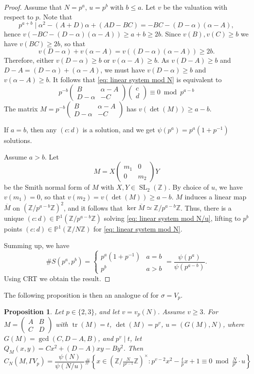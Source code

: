 \documentclass[12pt]{amsart}
\renewcommand{\P}{\mathbb{P}}
\newcommand{\Z}{\mathbb{Z}}
\DeclareMathOperator{\tr}{tr}
\newcommand{\SL}{\operatorname{SL}}
\numberwithin{equation}{subsection}
\theoremstyle{plain}\newtheorem{ithm}{Theorem}
\theoremstyle{plain}\newtheorem{iprop}[ithm]{Proposition}
\newtheorem{proposition}[equation]{Proposition}
\theoremstyle{definition}
\theoremstyle{remark}
\newcommand{\mattwo}[4]{\left( \begin{array}{cc} {#1} & {#2} \\ {#3} & {#4} \end{array} \right)}
\newcommand{\vectwo}[2]{\left( \begin{array}{c} {#1} \\ {#2} \end{array} \right)}
\begin{document}
\begin{proof}
    Assume that $N = p^a$, $u = p^b$ with $b \le a$. Let $v$ be the valuation with respect to $p$. 
    Note that
    $$
    p^{a+b} \mid \alpha^2 - (A+D) \alpha + (AD-BC) = -BC - (D-\alpha)(\alpha - A),
    $$
    hence $v(-BC - (D-\alpha)(\alpha - A)) \ge a + b \ge 2b$. 
    Since $v(B), v(C) \ge b$ we have $v(BC) \ge 2b$, so that 
    $$
    v(D - \alpha) + v(\alpha - A) = v((D - \alpha)(\alpha - A)) \ge 2b.
    $$
    Therefore, either $v(D - \alpha) \ge b$ or $v(\alpha - A) \ge b$.
    As $v(D - A) \ge b$ and $D - A = (D - \alpha) + (\alpha - A)$, we must have $v(D - \alpha) \ge b$ and $v(\alpha - A) \ge b$.
    It follows that \eqref{eq: linear system mod N} is equivalent to
    \begin{equation} \label{eq: linear system mod N/u}
    p^{-b}\mattwo{B}{\alpha - A}{D - \alpha}{-C}
    \vectwo{c}{d} \equiv 0 \bmod p^{a-b}
    \end{equation}
    The matrix $M = p^{-b}\mattwo{B}{\alpha - A}{D - \alpha}{-C}$ has $v(\det(M)) \ge a - b$.

    If $a = b$, then any $(c:d)$ is a solution, and we get $\psi(p^a) = p^a(1 + p^{-1})$ solutions.

    Assume $a > b$.
    Let $$M = X \mattwo{m_1}{0}{0}{m_2}Y$$ be the Smith normal form of $M$ with $X,Y \in \SL_2(\Z)$. By choice of $u$, we have $v(m_1) = 0$, so that $v(m_2) = v(\det(M)) \ge a - b$.
    $M$ induces a linear map $\overline{M}$ on $(\Z/ p^{a-b} \Z)^2$,
    and it follows that $\ker \overline{M} \simeq \Z / p^{a-b} \Z$. Thus, there is a unique $(c:d) \in \P^1(\Z / p^{a-b} \Z)$ solving \eqref{eq: linear system mod N/u}, lifting to $p^b$ points $(c:d) \in \P^1(\Z / N \Z)$ for \eqref{eq: linear system mod N}.

    Summing up, we have 
    $$
    \# S(p^a , p^b) = \begin{cases}
        p^a(1+p^{-1}) & a = b \\
        p^b & a > b
    \end{cases}
    = \frac{\psi(p^a)}{\psi(p^{a-b})}.
    $$
    Using CRT we obtain the result.
\end{proof}

The following proposition is then an analogue of \cite[Lemma 4.1]{PopaII} for $\sigma = V_p$.

\begin{proposition} Let $p \in \{2,3\}$, and let $v = v_p(N)$. Assume $v \ge 3$.
    For $M = \mattwo{A}{B}{C}{D}$ with $\tr(M) = t$, $\det(M) = p^v$, $u = (G(M),N)$, where $G(M) = \gcd(C, D-A, B)$, and $p^v \mid t$, let $Q_M(x,y) = Cx^2 + (D-A)xy -By^2$. Then
   \begin{equation}
    C_N(M,  \Gamma V_p) = \frac{\psi(N)}{\psi(N/u)} \# 
    \left \{ x \in \left( \Z / \tfrac{N}{p^{v-1}} \Z \right)^{\times} : 
    p^{v-2} x^2 - \tfrac{t}{p} x + 1 \equiv 0 \bmod \tfrac{N}{p^v} \cdot u\right\}
   \end{equation}
\end{proposition}
\end{document}
